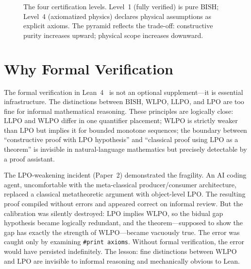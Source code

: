 \documentclass[11pt,a4paper]{report}
\theoremstyle{plain}
\theoremstyle{definition}
\theoremstyle{remark}
\newcommand{\BISH}{\mathrm{BISH}}
\newcommand{\LLPO}{\mathrm{LLPO}}
\newcommand{\WLPO}{\mathrm{WLPO}}
\newcommand{\LPO}{\mathrm{LPO}}
\begin{document}
\begin{figure}[t]
\centering
{}
\caption{The four certification levels. Level~1 (fully verified) is pure $\BISH$; Level~4 (axiomatized physics) declares physical assumptions as explicit axioms. The pyramid reflects the trade-off: constructive purity increases upward; physical scope increases downward.}
\label{fig:certification}
\end{figure}

\section{Why Formal Verification}

The formal verification in Lean~4~\cite{deMoura2021} is not an optional supplement---it is essential infrastructure. The distinctions between $\BISH$, $\WLPO$, $\LLPO$, and $\LPO$ are too fine for informal mathematical reasoning. These principles are logically close: $\LLPO$ and $\WLPO$ differ in one quantifier placement; $\WLPO$ is strictly weaker than $\LPO$ but implies it for bounded monotone sequences; the boundary between ``constructive proof with $\LPO$ hypothesis'' and ``classical proof using $\LPO$ as a theorem'' is invisible in natural-language mathematics but precisely detectable by a proof assistant.

The LPO-weakening incident (Paper~2) demonstrated the fragility. An AI coding agent, uncomfortable with the meta-classical producer/consumer architecture, replaced a classical metatheoretic argument with object-level $\LPO$. The resulting proof compiled without errors and appeared correct on informal review. But the calibration was silently destroyed: $\LPO$ implies $\WLPO$, so the bidual gap hypothesis became logically redundant, and the theorem---supposed to show the gap has exactly the strength of $\WLPO$---became vacuously true. The error was caught only by examining \texttt{\#print axioms}. Without formal verification, the error would have persisted indefinitely. The lesson: fine distinctions between $\WLPO$ and $\LPO$ are invisible to informal reasoning and mechanically obvious to Lean.
\end{document}
